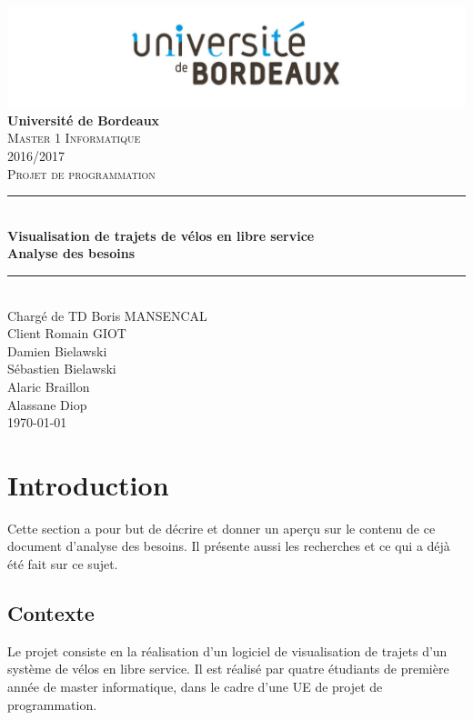 \documentclass[12pt]{article}
\begin{document}
	\begin{titlepage}
		\includegraphics[scale=0.2]{logo_bordeaux.png}\\
		\centering
		{\LARGE \bfseries Université de Bordeaux}\\ [2cm]
		\textsc{\Large Master 1 Informatique}\\ [0,3cm]
		\textsc{\Large 2016/2017}\\ [1,5cm]

		\textsc{\Large Projet de programmation}\\ [1.5cm]


		\rule{16cm}{1mm}\\ [0,7cm]
		{ \huge \bfseries Visualisation de trajets de vélos en libre service} \\[0,5cm]
		{ \huge \bfseries Analyse des besoins}\\ [0,7cm]
		\rule{16cm}{1mm}\\ [1cm]

		{\Large Chargé de TD Boris MANSENCAL }\\ [0,3cm]
		{\Large Client Romain GIOT }\\ [1cm]

		{\Large Damien Bielawski }\\ [0,3cm]
		{\Large Sébastien Bielawski }\\[0,3cm]
		{\Large Alaric Braillon }\\ [0,3cm]
		{\Large Alassane Diop }\\ [2cm]
		\Large\today

	\end{titlepage}

	\tableofcontents \newpage

	\section{Introduction}
		Cette section a pour but de décrire et donner un aperçu sur le contenu de ce document d'analyse des besoins. Il présente aussi les recherches et ce qui a déjà été fait sur ce sujet.

		\subsection{Contexte}
			Le projet consiste en la réalisation d’un logiciel de visualisation de trajets d'un système de vélos en libre service. 
			Il est réalisé par quatre étudiants de première année de master informatique, dans le cadre d'une UE de projet de programmation.
\end{document}
